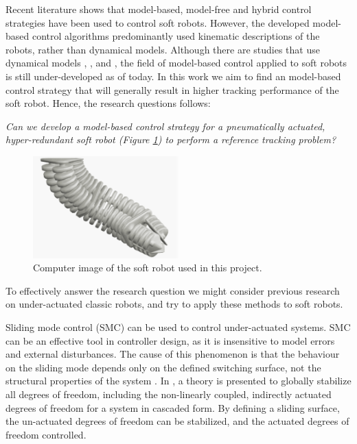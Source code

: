 Recent literature shows that model-based, model-free and hybrid control strategies have been used to control soft robots. However, the developed model-based control algorithms predominantly used kinematic descriptions of the robots, rather than dynamical models. Although there are studies that use dynamical models  \cite{falkenhahn2016dynamic}, \cite{della2020model}, and \cite{kapadia2011task}, the field of model-based control applied to soft robots is still under-developed as of today. In this work we aim to find an model-based control strategy that will generally result in higher tracking performance of the soft robot. Hence, the research questions follows:



\textit{Can we develop a model-based control strategy for a pneumatically actuated, hyper-redundant soft robot (Figure \ref{fig:sorotoki}) to perform a reference tracking problem?}




\begin{figure}[H]
    \centering
    \includegraphics[width = 0.5\textwidth]{Figures/sorotoki1.png}
    \caption{Computer image of the soft robot used in this project.}
    \label{fig:sorotoki}
\end{figure}


To effectively answer the research question we might consider previous research on under-actuated classic robots, and try to apply these methods to soft robots.

Sliding mode control (SMC) can be used to control under-actuated systems. SMC can be an effective tool in controller design, as it is insensitive to model errors and external disturbances. The cause of this phenomenon is that the behaviour on the sliding mode depends only on the defined switching surface, not the structural properties of the system \cite{liu2013survey}. In \cite{xu2008sliding}, a theory is presented to globally stabilize all degrees of freedom, including the non-linearly coupled, indirectly actuated degrees of freedom for a system in cascaded form. By defining a sliding surface, the un-actuated degrees of freedom can be stabilized, and the actuated degrees of freedom controlled.

